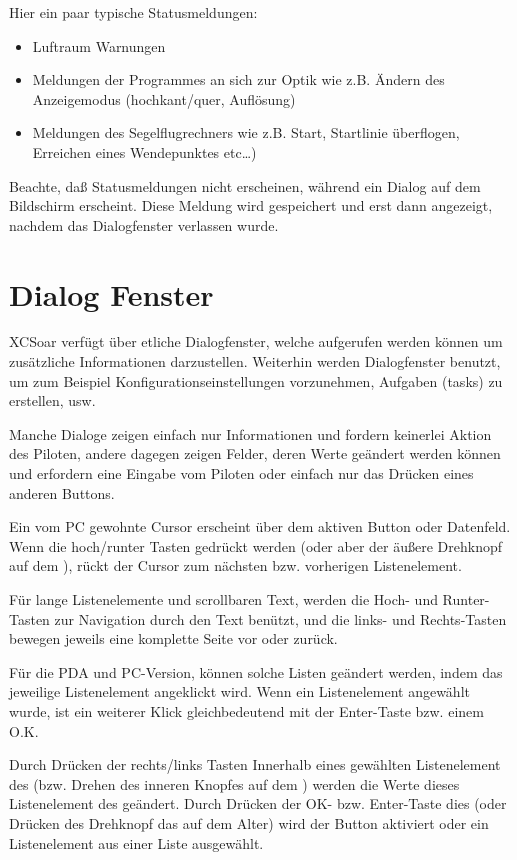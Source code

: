 Hier ein paar typische Statusmeldungen:
\begin{itemize}
\item Luftraum Warnungen
\item Meldungen der Programmes an sich zur Optik wie z.B. Ändern des Anzeigemodus (hochkant/quer, Auflösung)
\item Meldungen des Segelflugrechners wie z.B. Start, Startlinie überflogen, Erreichen eines Wendepunktes etc\dots  )
\end{itemize}

Beachte, daß Statusmeldungen nicht erscheinen, während ein Dialog auf dem Bildschirm erscheint. Diese Meldung wird gespeichert und erst dann angezeigt, nachdem das Dialogfenster verlassen wurde.

\section{Dialog Fenster}\label{sec:dialog-windows}

\textsf{XCSoar} verfügt über etliche Dialogfenster, welche aufgerufen werden können um zusätzliche Informationen darzustellen. Weiterhin werden Dialogfenster benutzt, um zum Beispiel Konfigurationseinstellungen vorzunehmen, Aufgaben (tasks) zu erstellen, usw.\

Manche Dialoge zeigen einfach nur Informationen und fordern keinerlei Aktion des Piloten, andere dagegen zeigen Felder, deren Werte geändert werden können und erfordern eine Eingabe vom Piloten oder einfach nur das Drücken eines anderen Buttons.

Ein vom \textsf{PC} gewohnte Cursor erscheint über dem aktiven Button oder Datenfeld.
Wenn die hoch/runter Tasten gedrückt werden (oder aber der äußere Drehknopf auf dem \al), rückt der Cursor zum nächsten bzw. vorherigen Listenelement.

Für lange Listenelemente und scrollbaren Text, werden die Hoch- und Runter-Tasten zur Navigation durch den Text benützt, und die links- und Rechts-Tasten bewegen jeweils eine komplette Seite vor oder zurück.

Für die PDA und \textsf{PC}-Version, können solche Listen geändert werden, indem das jeweilige Listenelement angeklickt wird.
Wenn ein Listenelement angewählt wurde, ist ein weiterer Klick gleichbedeutend mit der Enter-Taste bzw. einem O.K.

Durch Drücken der rechts/links Tasten Innerhalb eines gewählten Listenelement des (bzw. Drehen des inneren Knopfes auf dem \al) werden die Werte dieses Listenelement des geändert. Durch Drücken der OK- bzw. Enter-Taste dies (oder Drücken des Drehknopf das auf dem Alter) wird der Button aktiviert oder ein Listenelement aus einer Liste ausgewählt.

